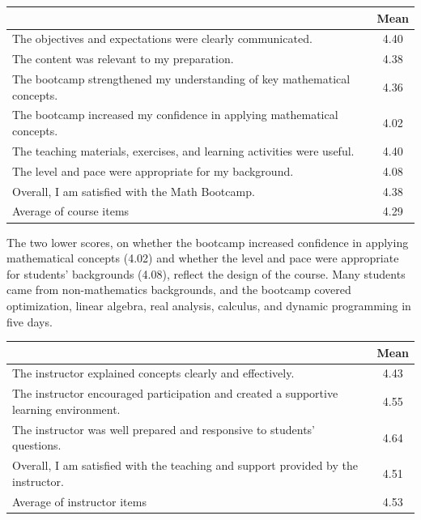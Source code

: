 \documentclass[11pt]{article}
\begin{document}
{\small
\begin{tabularx}{\textwidth}{@{}X c@{}}
\toprule
& Mean \\
\midrule
The objectives and expectations were clearly communicated. & 4.40 \\
The content was relevant to my preparation. & 4.38 \\
The bootcamp strengthened my understanding of key mathematical concepts. & 4.36 \\
The bootcamp increased my confidence in applying mathematical concepts. & 4.02 \\
The teaching materials, exercises, and learning activities were useful. & 4.40 \\
The level and pace were appropriate for my background. & 4.08 \\
Overall, I am satisfied with the Math Bootcamp. & 4.38 \\
\midrule
Average of course items & 4.29 \\
\bottomrule
\end{tabularx}
}

The two lower scores, on whether the bootcamp increased confidence in applying mathematical concepts (4.02) and whether the level and pace were appropriate for students' backgrounds (4.08), reflect the design of the course. Many students came from non-mathematics backgrounds, and the bootcamp covered optimization, linear algebra, real analysis, calculus, and dynamic programming in five days.

\vspace{0.4em}
{\small
\begin{tabularx}{\textwidth}{@{}X c@{}}
\toprule
& Mean \\
\midrule
The instructor explained concepts clearly and effectively. & 4.43 \\
The instructor encouraged participation and created a supportive learning environment. & 4.55 \\
The instructor was well prepared and responsive to students' questions. & 4.64 \\
Overall, I am satisfied with the teaching and support provided by the instructor. & 4.51 \\
\midrule
Average of instructor items & 4.53 \\
\bottomrule
\end{tabularx}
}
\end{document}
